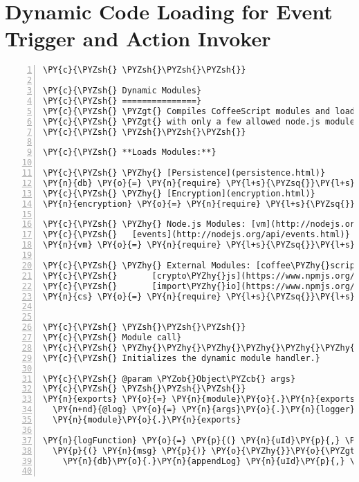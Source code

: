 \section{Dynamic Code Loading for Event Trigger and Action Invoker}
\begin{Verbatim}[fontsize=\scriptsize,commandchars=\\\{\},numbers=left,firstnumber=1,stepnumber=1]
\PY{c}{\PYZsh{} \PYZsh{}\PYZsh{}\PYZsh{}}

\PY{c}{\PYZsh{} Dynamic Modules}
\PY{c}{\PYZsh{} ===============}
\PY{c}{\PYZsh{} \PYZgt{} Compiles CoffeeScript modules and loads JS modules in a VM, together}
\PY{c}{\PYZsh{} \PYZgt{} with only a few allowed node.js modules.}
\PY{c}{\PYZsh{} \PYZsh{}\PYZsh{}\PYZsh{}}

\PY{c}{\PYZsh{} **Loads Modules:**}

\PY{c}{\PYZsh{} \PYZhy{} [Persistence](persistence.html)}
\PY{n}{db} \PY{o}{=} \PY{n}{require} \PY{l+s}{\PYZsq{}}\PY{l+s}{./persistence}\PY{l+s}{\PYZsq{}}
\PY{c}{\PYZsh{} \PYZhy{} [Encryption](encryption.html)}
\PY{n}{encryption} \PY{o}{=} \PY{n}{require} \PY{l+s}{\PYZsq{}}\PY{l+s}{./encryption}\PY{l+s}{\PYZsq{}}

\PY{c}{\PYZsh{} \PYZhy{} Node.js Modules: [vm](http://nodejs.org/api/vm.html) and}
\PY{c}{\PYZsh{}   [events](http://nodejs.org/api/events.html)}
\PY{n}{vm} \PY{o}{=} \PY{n}{require} \PY{l+s}{\PYZsq{}}\PY{l+s}{vm}\PY{l+s}{\PYZsq{}}

\PY{c}{\PYZsh{} \PYZhy{} External Modules: [coffee\PYZhy{}script](http://coffeescript.org/),}
\PY{c}{\PYZsh{}       [crypto\PYZhy{}js](https://www.npmjs.org/package/crypto\PYZhy{}js) and}
\PY{c}{\PYZsh{}       [import\PYZhy{}io](https://www.npmjs.org/package/import\PYZhy{}io)}
\PY{n}{cs} \PY{o}{=} \PY{n}{require} \PY{l+s}{\PYZsq{}}\PY{l+s}{coffee\PYZhy{}script}\PY{l+s}{\PYZsq{}}


\PY{c}{\PYZsh{} \PYZsh{}\PYZsh{}\PYZsh{}}
\PY{c}{\PYZsh{} Module call}
\PY{c}{\PYZsh{} \PYZhy{}\PYZhy{}\PYZhy{}\PYZhy{}\PYZhy{}\PYZhy{}\PYZhy{}\PYZhy{}\PYZhy{}\PYZhy{}\PYZhy{}}
\PY{c}{\PYZsh{} Initializes the dynamic module handler.}

\PY{c}{\PYZsh{} @param \PYZob{}Object\PYZcb{} args}
\PY{c}{\PYZsh{} \PYZsh{}\PYZsh{}\PYZsh{}}
\PY{n}{exports} \PY{o}{=} \PY{n}{module}\PY{o}{.}\PY{n}{exports} \PY{o}{=} \PY{p}{(} \PY{n}{args} \PY{p}{)} \PY{o}{=}\PY{o}{\PYZgt{}}
  \PY{n+nd}{@log} \PY{o}{=} \PY{n}{args}\PY{o}{.}\PY{n}{logger}
  \PY{n}{module}\PY{o}{.}\PY{n}{exports}

\PY{n}{logFunction} \PY{o}{=} \PY{p}{(} \PY{n}{uId}\PY{p}{,} \PY{n}{rId}\PY{p}{,} \PY{n}{mId} \PY{p}{)} \PY{o}{\PYZhy{}}\PY{o}{\PYZgt{}}
  \PY{p}{(} \PY{n}{msg} \PY{p}{)} \PY{o}{\PYZhy{}}\PY{o}{\PYZgt{}}
    \PY{n}{db}\PY{o}{.}\PY{n}{appendLog} \PY{n}{uId}\PY{p}{,} \PY{n}{rId}\PY{p}{,} \PY{n}{mId}\PY{p}{,} \PY{n}{msg}


\end{Verbatim}
